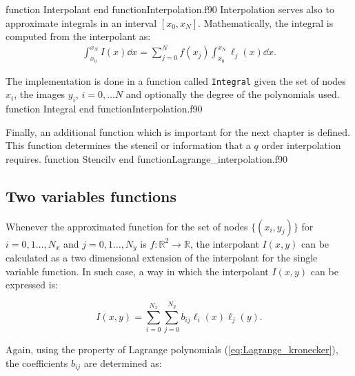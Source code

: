     \newpage
    \vspace{0.5cm} 
    {function Interpolant}
    {end function}{Interpolation.f90}
    \vspace{-0.4cm}
   Interpolation serves also to approximate integrals in an interval $[x_0,x_N]$. Mathematically, the integral is computed from the interpolant as:
    \begin{align}
    \int_{x_0}^{x_N}I(x) \dd x
    = 
    \sum_{j=0}^{N}  f(x_j) \int_{x_0}^{x_N} \ell_j (x) \dd x.
    \end{align} 
    
    The implementation is done in a function called \verb|Integral| given the set of nodes $x_i$, the images $y_i$, $i=0,\ldots N$ and optionally the degree of the polynomials used.
    \vspace{0.5cm} 
    {function Integral}
    {end function}{Interpolation.f90}
    
    \newpage

    Finally, an additional function which is important for the next chapter is defined. This function determines the stencil or information that a $q$ order interpolation requires.
    \vspace{0.5cm} 
    {function Stencilv}
    {end function}{Lagrange_interpolation.f90}
    
    
    
    \subsection{Two variables functions}
    
    Whenever the approximated function for the set of nodes $\{(x_i,y_j)\}$ for $i=0,1\ldots , N_x$ and $j=0,1\ldots , N_y$ is $f:\mathbb{R}^2\rightarrow\mathbb{R}$, the interpolant $I(x,y)$ can be calculated as a two dimensional extension of the interpolant for the single variable function. In such case, a way in which the interpolant $I(x,y)$ can be expressed is:
    
    \begin{equation}
     {I}(x,y) = \sum_{i=0}^{N_x} \sum_{j=0}^{N_y} b_{ij} \ell_i(x) \ell_j(y) .
    \end{equation}
    
    Again, using the property of Lagrange polynomials (\ref{eq:Lagrange_kronecker}), the coefficients $b_{ij}$ are determined as:
    
